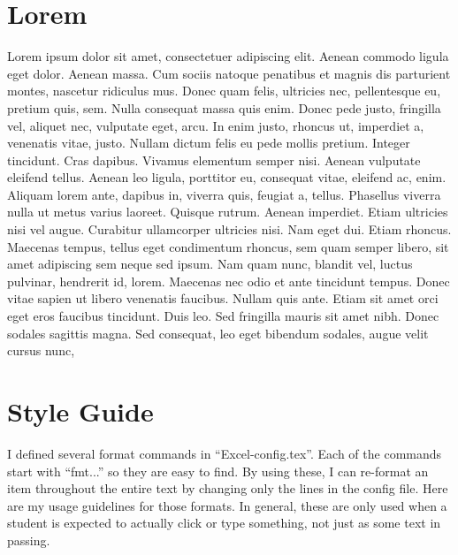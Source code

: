 \section{Lorem}
Lorem ipsum dolor sit amet, consectetuer adipiscing elit. Aenean commodo ligula eget dolor. Aenean massa. Cum sociis natoque penatibus et magnis dis parturient montes, nascetur ridiculus mus. Donec quam felis, ultricies nec, pellentesque eu, pretium quis, sem. Nulla consequat massa quis enim. Donec pede justo, fringilla vel, aliquet nec, vulputate eget, arcu. In enim justo, rhoncus ut, imperdiet a, venenatis vitae, justo. Nullam dictum felis eu pede mollis pretium. Integer tincidunt. Cras dapibus. Vivamus elementum semper nisi. Aenean vulputate eleifend tellus. Aenean leo ligula, porttitor eu, consequat vitae, eleifend ac, enim. Aliquam lorem ante, dapibus in, viverra quis, feugiat a, tellus. Phasellus viverra nulla ut metus varius laoreet. Quisque rutrum. Aenean imperdiet. Etiam ultricies nisi vel augue. Curabitur ullamcorper ultricies nisi. Nam eget dui. Etiam rhoncus. Maecenas tempus, tellus eget condimentum rhoncus, sem quam semper libero, sit amet adipiscing sem neque sed ipsum. Nam quam nunc, blandit vel, luctus pulvinar, hendrerit id, lorem. Maecenas nec odio et ante tincidunt tempus. Donec vitae sapien ut libero venenatis faucibus. Nullam quis ante. Etiam sit amet orci eget eros faucibus tincidunt. Duis leo. Sed fringilla mauris sit amet nibh. Donec sodales sagittis magna. Sed consequat, leo eget bibendum sodales, augue velit cursus nunc,

\section{Style Guide}

I defined several format commands in ``Excel-config.tex''. Each of the commands start with ``fmt...'' so they are easy to find. By using these, I can re-format an item throughout the entire text by changing only the lines in the config file. Here are my usage guidelines for those formats. In general, these are only used when a student is expected to actually click or type something, not just as some text in passing.


